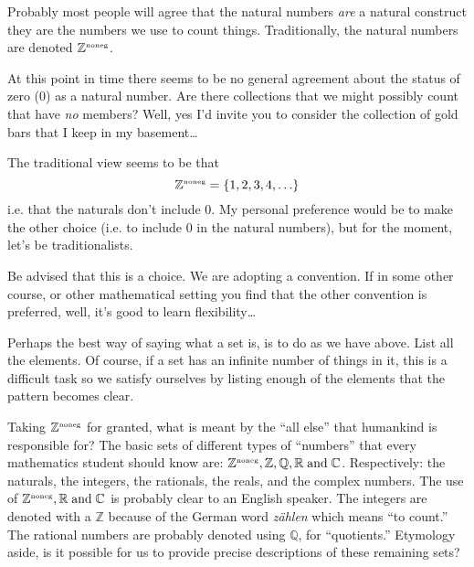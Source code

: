 \documentclass[10pt,]{book}
\theoremstyle{plain}
\theoremstyle{definition}
\theoremstyle{definition}
\numberwithin{equation}{section}
\renewcommand{\Naturals}{{\mathbb Z}^{\mbox{\tiny noneg}} }
\newcommand{\Naturals}{{\mathbb N}}
\newcommand{\Integers}{{\mathbb Z}}
\newcommand{\Rationals}{{\mathbb Q}}
\newcommand{\Reals}{{\mathbb R}}
\newcommand{\Complexes}{{\mathbb C}}
\begin{document}
    Probably most people will agree that the
     natural numbers \emph{are} a natural construct \textemdash{} they are the numbers we use to count things. Traditionally, the natural numbers are denoted \(\Naturals\).
\par

    At this point in time there seems to be no general agreement about the status
    of zero (\(0\)) as a natural number. Are there collections that we might possibly
    count that have \emph{no} members? Well, yes \textemdash{} I'd invite you to consider the collection of gold bars that I keep in my basement\dots{}
\par

    The traditional view seems to be that
    \begin{equation*}
      \Naturals = \{1, 2, 3, 4, \ldots \}
    \end{equation*}
    i.e. that the naturals don't include 0. My personal
    preference would be to make the other choice (i.e. to include \(0\)
    in the natural numbers), but for the moment, let's be traditionalists.
\par

    Be advised that this is a choice. We are adopting a
    convention. If in some other course, or other mathematical setting
    you find that the other convention is preferred, well, it's good to
    learn flexibility\dots{}
\par

    Perhaps the best way of saying what a set is, is to do as we
    have above. List all the elements. Of course, if a set has an
    infinite number of things in it, this is a difficult task \textemdash{} so
    we satisfy ourselves by listing enough of the elements that the
    pattern becomes clear.
\par

    Taking \(\Naturals\) for granted, what is meant by the ``all else''
    that humankind is responsible for? The basic sets of different types
    of ``numbers'' that every mathematics student should know are: \(\Naturals,
    \Integers, \Rationals, \Reals
    \; \mbox{and}  \; \Complexes\). Respectively: the naturals, the integers, the
    rationals, the reals, and the complex numbers. The use of \(\Naturals,
    \Reals \; \mbox{and}  \; \Complexes\) is probably clear to an English
    speaker. The integers are denoted with a \(\Integers\) because of the
    German word \emph{zählen} which means ``to count.'' The rational numbers are
    probably denoted using \(\Rationals\), for ``quotients.'' Etymology
    aside, is it possible for us to provide precise descriptions of these
    remaining sets?
\par
\end{document}
